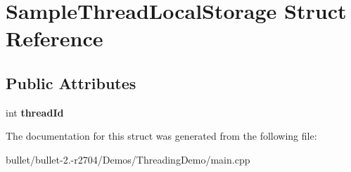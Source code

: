 \hypertarget{struct_sample_thread_local_storage}{\section{Sample\+Thread\+Local\+Storage Struct Reference}
\label{struct_sample_thread_local_storage}
}
\subsection*{Public Attributes}
\begin{DoxyCompactItemize}
\item 
\hypertarget{struct_sample_thread_local_storage_accd93e15bfbb1c81dd858ed02fa063e5}{int {\bfseries thread\+Id}}\label{struct_sample_thread_local_storage_accd93e15bfbb1c81dd858ed02fa063e5}

\end{DoxyCompactItemize}


The documentation for this struct was generated from the following file\+:\begin{DoxyCompactItemize}
\item 
bullet/bullet-\/2.-\/r2704/\+Demos/\+Threading\+Demo/main.\+cpp\end{DoxyCompactItemize}
